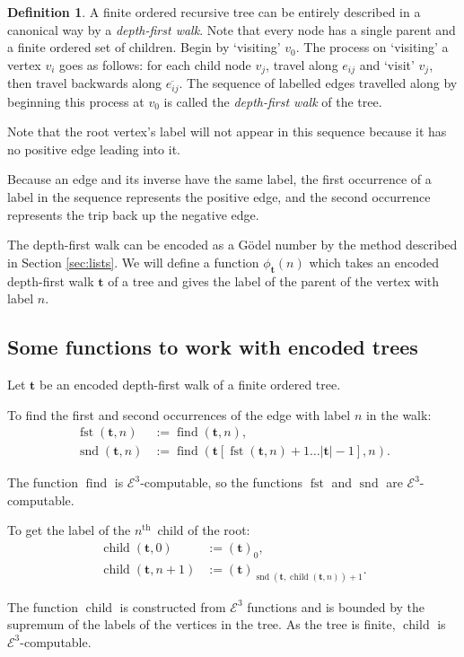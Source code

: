 \documentclass[a4paper]{article}
\newcommand{\grz}[1]{$\mathcal{E}^{#1}$}	%
\newcommand{\nth}{$n^{\textrm{th}}$~}	%
\newcommand{\tvec}{\mathbf{t}}	%
\newcommand{\recur}[1]{\begin{equation} \begin{split} #1 \end{split} \end{equation}}	%
\newcommand{\find}{\operatorname{find}}
\theoremstyle{plain}
\theoremstyle{definition}
\newtheorem{definition}[theorem]{Definition}
\begin{document}
\begin{definition}
	A finite ordered recursive tree can be entirely described in a canonical way by a {\it depth-first walk}. Note that every node has a single parent and a finite ordered set of children. Begin by `visiting' $v_0$. The process on `visiting' a vertex $v_i$ goes as follows: for each child node $v_j$, travel along $e_{ij}$ and `visit' $v_j$, then travel backwards along $\overline{e_{ij}}$. The sequence of labelled edges travelled along by beginning this process at $v_0$ is called the {\it depth-first walk} of the tree.
\end{definition}

Note that the root vertex's label will not appear in this sequence because it has no positive edge leading into it. 

Because an edge and its inverse have the same label, the first occurrence of a label in the sequence represents the positive edge, and the second occurrence represents the trip back up the negative edge.

The depth-first walk can be encoded as a G\"odel number by the method described in Section \ref{sec:lists}. We will define a function $\phi_{\tvec}(n)$ which takes an encoded depth-first walk $\tvec$ of a tree and gives the label of the parent of the 
vertex with label $n$. 

\subsection{Some functions to work with encoded trees}\label{encodetrees}

Let $\tvec$ be an encoded depth-first walk of a finite ordered tree.

To find the first and second occurrences of the edge with label $n$ in the walk:
\recur{
\operatorname{fst}(\tvec,n) &:= \find(\tvec,n), \\
\operatorname{snd}(\tvec,n) &:= \find\left( \tvec[\operatorname{fst}(\tvec,n)+1 \dots |\tvec|-1],n \right).
}

The function $\operatorname{find}$ is \grz{3}-computable, so the functions $\operatorname{fst}$ and $\operatorname{snd}$ are \grz{3}-computable.

To get the label of the \nth child of the root:
\recur{
\operatorname{child}(\tvec,0) &:= (\tvec)_0, \\
\operatorname{child}(\tvec,n+1) &:= (\tvec)_{\operatorname{snd}(\tvec,\operatorname{child}(\tvec,n))+1}.
}

The function $\operatorname{child}$ is constructed from \grz{3} functions and is bounded by the supremum of the labels of the vertices in the tree. As the tree is finite, $\operatorname{child}$ is \grz{3}-computable.
\end{document}
